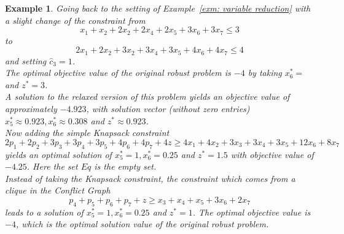 \documentclass[titlepage, a4paper]{amsbook}
\theoremstyle{plain}
\theoremstyle{break}
\newtheorem{exm}[thm]{Example}
\theoremstyle{definition}
\theoremstyle{remark}
\numberwithin{equation}{thm}
\begin{document}
\begin{exm}
Going back to the setting of Example~\ref{exm: variable reduction} with a slight change of the constraint from 
\[x_1 + x_2 + 2x_2+2x_4+2x_5+ 3x_6+ 3x_7 \leq 3\]
to
\[2x_1 + 2x_2 + 3x_2+3x_4+3x_5+ 4x_6+ 4x_7 \leq 4\]
and setting $\hat{c}_3=1$. \\
The optimal objective value of the original robust problem is $-4$ by taking $x^*_6=$ and $z^*=3$. \\
A solution to the relaxed version of this problem yields an objective value of approximately $-4.923$, with solution vector (without zero entries) $x^*_5\approx 0.923, x^*_6 \approx 0.308$ and $z^* \approx 0.923$. \\
Now adding the simple Knapsack constraint 
\[2p_1+ 2p_2+ 3p_3 + 3p_4 + 3p_5+ 4p_6+ 4p_7 + 4z \geq 4x_1+4x_2+ 3x_3+ 3x_4 + 3x_5+ 12x_6+ 8x_7\]
yields an optimal solution of $x^*_5=1, x^*_6=0.25$ and $z^*=1.5$ with objective value of $-4.25$. Here the set $Eq$ is the empty set. \\
Instead of taking the Knapsack constraint, the constraint which comes from a clique in the Conflict Graph
\[p_4 + p_5 +p_6+ p_7 +z \geq x_3 + x_4 + x_5 + 3x_6 + 2x_7\]
leads to a solution of $x^*_5=1, x^*_6=0.25$ and $z^*=1$. The optimal objective value is $-4$, which is the optimal solution value of the original robust problem. 
\end{exm}
\end{document}
